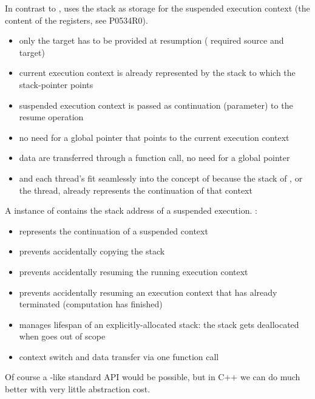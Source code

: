 

In contrast to \uc, \cc uses the stack as storage for the suspended
execution context (the content of the registers, see P0534R0\cite{P0534R0}).

\begin{itemize}
    \item only the target has to be provided at resumption
        ( required source and target)
    \item current execution context is already represented by the
        stack to which the stack-pointer points
    \item suspended execution context is passed as continuation (parameter) 
        to the resume operation
    \item no need for a global pointer that points to the current execution context
    \item data are transferred through a function call, no need for a global pointer
    \item \main and each thread's \entryfn fit seamlessly into the concept of \cc
        because the stack of \main, or the thread, already represents the continuation of
        that context
\end{itemize}


A instance of \cont contains the stack address of a suspended execution.
\cont:

\begin{itemize}
    \item represents the continuation of a suspended context
    \item prevents accidentally copying the stack
    \item prevents accidentally resuming the running execution
        context
    \item prevents accidentally resuming an execution context that has already
        terminated (computation has finished)
    \item manages lifespan of an explicitly-allocated stack: the stack gets
        deallocated when \cont goes out of scope
    \item context switch and data transfer via one function call
\end{itemize}

Of course a \uc-like standard API would be possible, but in C++ we can do much
better with very little abstraction cost.

